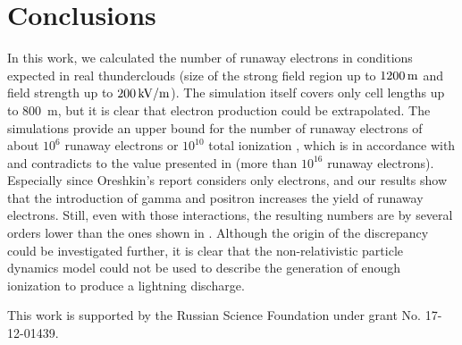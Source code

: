 \documentclass[doublecol,linenumbers]{epl2} %
\begin{document}

\section{Conclusions}

In this work, we calculated the number of runaway electrons in conditions expected in real thunderclouds (size of the strong field region up to $1200\un{m}$ and field strength up to $200\un{kV/m}$). The simulation itself covers only cell lengths up to 800~m, but it is clear that electron production could be extrapolated. The simulations provide an upper bound for the number of runaway electrons of about $10^6$ runaway electrons or $10^{10}$ total ionization , which is in accordance with \cite{Gurevich:2001, Dwyer2013_radio} and contradicts to the value presented in \cite{Oreshkin_2018} (more than $10^{16}$ runaway electrons). Especially since Oreshkin’s report considers only electrons, and our results show that the introduction of gamma and positron  increases the yield of runaway electrons.
Still, even with those interactions, the resulting numbers are by several orders lower than the ones shown in \cite{Oreshkin_2018}. Although the origin of the discrepancy could be investigated further, it is clear that the non-relativistic particle dynamics model could not be used to describe the generation of enough ionization to produce a lightning discharge.

\acknowledgments
This work is supported by the Russian Science Foundation under grant No. 17-12-01439.



\end{document}
